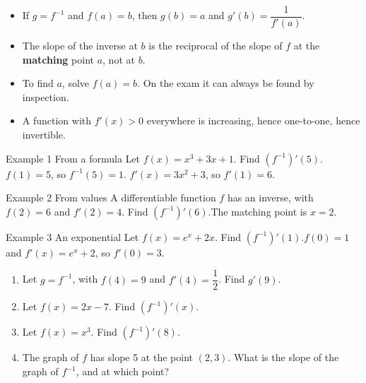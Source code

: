 \documentclass[11pt]{article}
\begin{document}

\begin{ideabox}
\begin{itemize}[leftmargin=*,itemsep=2pt,topsep=2pt]
  \item If $g=f^{-1}$ and $f(a)=b$, then $g(b)=a$ and $g'(b)=\dfrac{1}{f'(a)}$.
  \item The slope of the inverse at $b$ is the reciprocal of the slope of $f$ at the \textbf{matching} point $a$, not at $b$.
  \item To find $a$, solve $f(a)=b$. On the exam it can always be found by inspection.
  \item A function with $f'(x)>0$ everywhere is increasing, hence one-to-one, hence invertible.
\end{itemize}
\end{ideabox}

\begin{example}{Example 1 \textperiodcentered{} From a formula}
Let $f(x)=x^3+3x+1$. Find $\left(f^{-1}\right)'(5)$.\soln $f(1)=5$, so $f^{-1}(5)=1$. $f'(x)=3x^2+3$, so $f'(1)=6$.
\end{example}

\begin{example}{Example 2 \textperiodcentered{} From values}
A differentiable function $f$ has an inverse, with $f(2)=6$ and $f'(2)=4$. Find $\left(f^{-1}\right)'(6)$.\soln The matching point is $x=2$.
\end{example}

\begin{example}{Example 3 \textperiodcentered{} An exponential}
Let $f(x)=e^{x}+2x$. Find $\left(f^{-1}\right)'(1)$.\soln $f(0)=1$ and $f'(x)=e^{x}+2$, so $f'(0)=3$.
\end{example}

\newpage
{}

\begin{enumerate}[leftmargin=*,itemsep=2pt]
  \item Let $g=f^{-1}$, with $f(4)=9$ and $f'(4)=\dfrac12$. Find $g'(9)$.\work{2.3cm}
  \item Let $f(x)=2x-7$. Find $\left(f^{-1}\right)'(x)$.\work{2.3cm}
  \item Let $f(x)=x^3$. Find $\left(f^{-1}\right)'(8)$.\work{2.3cm}
  \item The graph of $f$ has slope 5 at the point $(2,3)$. What is the slope of the graph of $f^{-1}$, and at which point?\work{2.3cm}
\end{enumerate}
\end{document}
